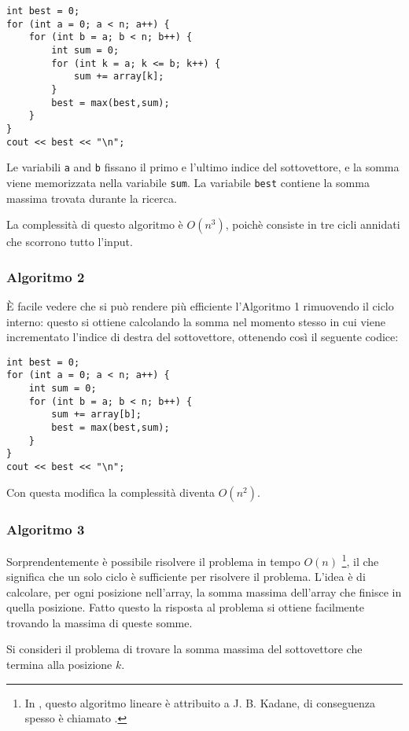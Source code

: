 \begin{lstlisting}
int best = 0;
for (int a = 0; a < n; a++) {
    for (int b = a; b < n; b++) {
        int sum = 0;
        for (int k = a; k <= b; k++) {
            sum += array[k];
        }
        best = max(best,sum);
    }
}
cout << best << "\n";
\end{lstlisting}
Le variabili \texttt{a} and \texttt{b} fissano il primo
e l'ultimo indice del sottovettore, e la somma viene
memorizzata nella variabile \texttt{sum}.
La variabile \texttt{best} contiene la somma massima trovata durante la ricerca.

La complessità di questo algoritmo è $O(n^3)$,
poichè consiste in tre cicli annidati che scorrono
tutto l'input.

\subsubsection{Algoritmo 2}

È facile vedere che si può rendere più efficiente l'Algoritmo 1
rimuovendo il ciclo interno: questo si ottiene calcolando la somma nel momento
stesso in cui viene incrementato l'indice di destra del sottovettore,
ottenendo così il seguente codice:

\begin{lstlisting}
int best = 0;
for (int a = 0; a < n; a++) {
    int sum = 0;
    for (int b = a; b < n; b++) {
        sum += array[b];
        best = max(best,sum);
    }
}
cout << best << "\n";
\end{lstlisting}
Con questa modifica la complessità diventa $O(n^2)$.

\subsubsection{Algoritmo 3}

Sorprendentemente è possibile risolvere il problema in tempo $O(n)$
\footnote{In \cite{ben86}, questo algoritmo lineare è attribuito a 
J. B. Kadane, di conseguenza spesso è chiamato
 .}, il che significa
che un solo ciclo è sufficiente per risolvere il problema.
L'idea è di calcolare, per ogni posizione nell'array,
la somma massima dell'array che finisce in quella posizione.
Fatto questo la risposta al problema si ottiene facilmente
trovando la massima di queste somme.

Si consideri il problema di trovare la somma massima del sottovettore
che termina alla posizione $k$.

